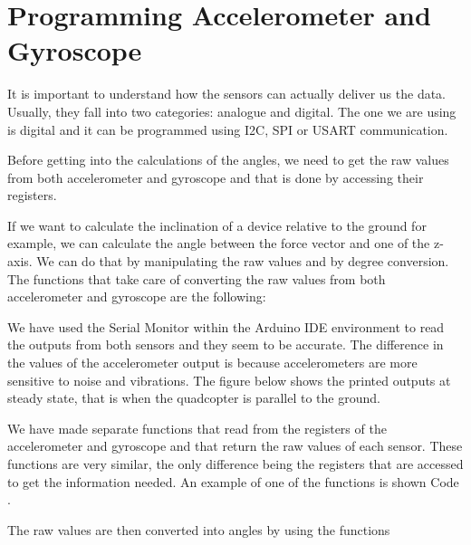 \section{Programming Accelerometer and Gyroscope}

It is important to understand how the sensors can actually deliver us the data. Usually, they fall into two categories: analogue and digital. The one we are using is digital and it can be programmed using I2C, SPI or USART communication. 

Before getting into the calculations of the angles, we need to get the raw values from both accelerometer and gyroscope and that is done by accessing their registers.

If we want to calculate the inclination of a device relative to the ground for example, we can calculate the angle between the force vector and one of the z-axis. We can do that by manipulating the raw values and by degree conversion. The functions that take care of converting the raw values from both accelerometer and gyroscope are the following:

We have used the Serial Monitor within the Arduino IDE environment to read the outputs from both sensors and they seem to be accurate. The difference in the values of the accelerometer output is because accelerometers are more sensitive to noise and vibrations. The figure below shows the printed outputs at steady state, that is when the quadcopter is parallel to the ground.

We have made separate functions that read from the registers of the accelerometer and gyroscope and that return the raw values of each sensor. These functions are very similar, the only difference being the registers that are accessed to get the information needed. An example of one of the functions is shown Code \label{c1}.



\clearpage

The raw values are then converted into angles by using the functions






